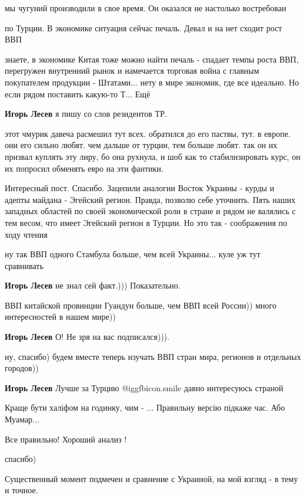 \begin{itemize}
мы чугуний производили в свое время. Он оказался не настолько востребован

по Турции. В экономике ситуация сейчас печаль. Девал и на нет сходит рост ВВП

\begin{itemize} %
знаете, в экономике Китая тоже можно найти печаль - спадает темпы роста ВВП, перегружен внутренний рынок и намечается торговая война с главным покупателем продукции - Штатами... нету в мире экономик, где все идеально. Но если рядом поставить какую-то Т... Ещё

\textbf{Игорь Лесев} я пишу со слов резидентов ТР.

этот чмурик давеча расмешил тут всех. обратился до его паствы, тут. в европе. они его сильно любят. чем дальше от турции, тем больше любят. так он их призвал куплять эту лиру, бо она рухнула, и шоб как то стабилизировать курс, он их попросил обменять евро на эти фантики.
\end{itemize} %


Интересный пост. Спасибо. Зацепили аналогии Восток Украины - курды и адепты
майдана - Эгейский регион.  Правда, позволю себе уточнить. Пять наших западных
областей по своей экономической роли в стране и рядом не валялись с тем весом,
что имеет Эгейский регион в Турции. Но это так - соображения по ходу чтения

\begin{itemize} %
ну так ВВП одного Стамбула больше, чем всей Украины... куле уж тут сравнивать

\textbf{Игорь Лесев} не знал сей факт.))) Показательно.

ВВП китайской провинции Гуандун больше, чем ВВП всей России)) много интересностей в нашем мире))

\textbf{Игорь Лесев} О! Не зря на вас подписался))).

ну, спасибо) будем вместе теперь изучать ВВП стран мира, регионов и отдельных городов))

\textbf{Игорь Лесев} Лучше за Турцию  @igg{fbicon.smile}  давно интересуюсь страной
\end{itemize} %

Краще бути халіфом на годинку, чим - ... Правильну версію підкаже час. Або Муамар...

Все правильно! Хороший анализ !

спасибо)


Существенный момент подмечен и сравнение с Украиной, на мой взгляд - в тему и точное.

\end{itemize} %
